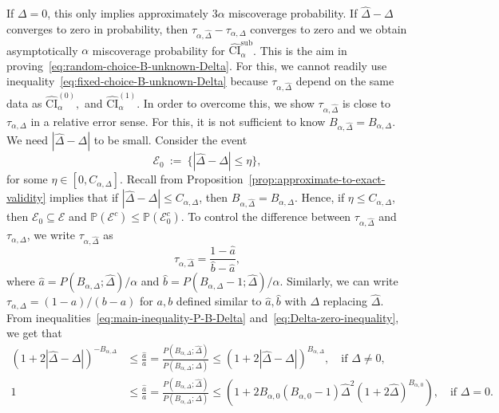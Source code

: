 \documentclass{article}
\numberwithin{myalgctr}{section}
\begin{document}
If $\Delta = 0$, this only implies approximately $3\alpha$ miscoverage probability. If $\widehat{\Delta} - \Delta$ converges to zero in probability, then $\tau_{\alpha,\widehat{\Delta}} - \tau_{\alpha,\Delta}$ converges to zero and we obtain asymptotically $\alpha$ miscoverage probability for $\widehat{\mathrm{CI}}_{\alpha}^{\mathrm{sub}}$. This is the aim in proving~\eqref{eq:random-choice-B-unknown-Delta}. For this, we cannot readily use inequality~\eqref{eq:fixed-choice-B-unknown-Delta} because $\tau_{\alpha,\widehat{\Delta}}$ depend on the same data as $\widehat{\mathrm{CI}}_{\alpha}^{(0)},$ and $\widehat{\mathrm{CI}}_{\alpha}^{(1)}$. In order to overcome this, we show $\tau_{\alpha,\widehat{\Delta}}$ is close to $\tau_{\alpha,\Delta}$ in a relative error sense. For this, it is not sufficient to know $B_{\alpha,\widehat{\Delta}}=B_{\alpha,\Delta}$. We need $|\widehat{\Delta} - \Delta|$ to be small. Consider the event
\[
\mathcal{E}_0 ~:=~ \{|\widehat{\Delta} - \Delta| \le \eta\},
\]
for some $\eta \in [0, C_{\alpha,\Delta}]$. Recall from Proposition~\ref{prop:approximate-to-exact-validity} implies that if $|\widehat{\Delta} - \Delta| \le C_{\alpha,\Delta}$, then $B_{\alpha,\widehat{\Delta}} = B_{\alpha,\Delta}$. Hence, if $\eta \le C_{\alpha,\Delta}$, then $\mathcal{E}_0\subseteq\mathcal{E}$ and $\mathbb{P}(\mathcal{E}^c) \le \mathbb{P}(\mathcal{E}_0^c)$. To control the difference between $\tau_{\alpha,\widehat{\Delta}}$ and $\tau_{\alpha,\Delta}$, we write $\tau_{\alpha,\widehat{\Delta}}$ as
\[
\tau_{\alpha,\widehat{\Delta}} = \frac{1 - \widehat{a}}{\widehat{b} - \widehat{a}},
\]
where $\widehat{a} = P(B_{\alpha,\Delta}; \widehat{\Delta})/\alpha$ and $\widehat{b} = P(B_{\alpha,\Delta} - 1; \widehat{\Delta})/\alpha$. Similarly, we can write $\tau_{\alpha,\Delta} = (1 - a)/(b - a)$ for $a, b$ defined similar to $\widehat{a}, \widehat{b}$ with $\Delta$ replacing $\widehat{\Delta}$. From inequalities~\eqref{eq:main-inequality-P-B-Delta} and~\eqref{eq:Delta-zero-inequality}, we get that
\begin{align*}
(1 + 2|\widehat{\Delta} - \Delta|)^{-B_{\alpha,\Delta}} &\le \frac{\widehat{a}}{a} = \frac{P(B_{\alpha,\Delta}; \widehat{\Delta})}{P(B_{\alpha,\Delta}; \Delta)} \le (1 + 2|\widehat{\Delta} - \Delta|)^{B_{\alpha,\Delta}},\quad\mbox{if }\Delta\neq 0,\\
1 &\le \frac{\widehat{a}}{a} = \frac{P(B_{\alpha,\Delta}; \widehat{\Delta})}{P(B_{\alpha,\Delta}; \Delta)} \le (1 + 2B_{\alpha,0}(B_{\alpha,0} - 1)\widehat{\Delta}^2(1 + 2\widehat{\Delta})^{B_{\alpha,0}}),\quad\mbox{if }\Delta = 0.
\end{align*}
\end{document}
